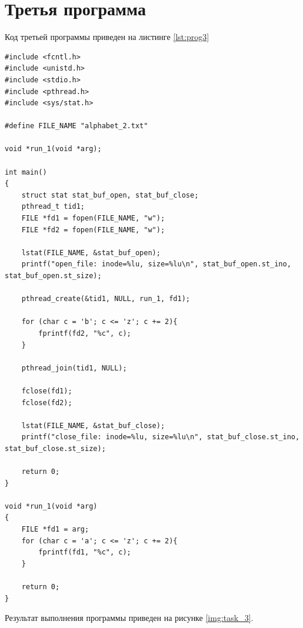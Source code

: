 \section{Третья программа}
Код третьей программы приведен на листинге \ref{lst:prog3}
\begin{lstlisting}[label=lst:prog3, caption=Код программы 3, basicstyle=\footnotesize]
#include <fcntl.h>
#include <unistd.h>
#include <stdio.h>
#include <pthread.h>
#include <sys/stat.h>

#define FILE_NAME "alphabet_2.txt"

void *run_1(void *arg);

int main()
{
	struct stat stat_buf_open, stat_buf_close;
	pthread_t tid1;
	FILE *fd1 = fopen(FILE_NAME, "w");
	FILE *fd2 = fopen(FILE_NAME, "w");
	
	lstat(FILE_NAME, &stat_buf_open);
	printf("open_file: inode=%lu, size=%lu\n", stat_buf_open.st_ino, stat_buf_open.st_size);
	
	pthread_create(&tid1, NULL, run_1, fd1);
	
	for (char c = 'b'; c <= 'z'; c += 2){
		fprintf(fd2, "%c", c);
	}
	
	pthread_join(tid1, NULL);
	
	fclose(fd1);
	fclose(fd2);
	
	lstat(FILE_NAME, &stat_buf_close);
	printf("close_file: inode=%lu, size=%lu\n", stat_buf_close.st_ino, stat_buf_close.st_size);
	
	return 0;
}

void *run_1(void *arg)
{
	FILE *fd1 = arg;
	for (char c = 'a'; c <= 'z'; c += 2){
		fprintf(fd1, "%c", c);
	}
	
	return 0;
}
\end{lstlisting}

Результат выполнения программы приведен на рисунке \ref{img:task_3}.
\begin{figure}[H]
\end{figure}

